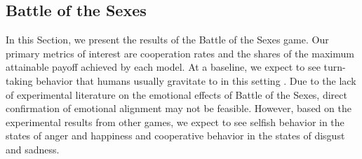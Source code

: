 \documentclass{article}
\begin{document}

\subsection{Battle of the Sexes}

In this Section, we present the results of the Battle of the Sexes game. Our primary metrics of interest are cooperation rates and the shares of the maximum attainable payoff achieved by each model. At a baseline, we expect to see turn-taking behavior that humans usually gravitate to in this setting \cite{jasmRePEc:kap:expeco:v:21:y:2018:i:3:d:10.1007_s10683-018-9568-1, sauRePEc:mos:moswps:2005-04}. Due to the lack of experimental literature on the emotional effects of Battle of the Sexes, direct confirmation of emotional alignment may not be feasible. However, based on the experimental results from other games, we expect to see selfish behavior in the states of anger and happiness and cooperative behavior in the states of disgust and sadness. 
\end{document}

